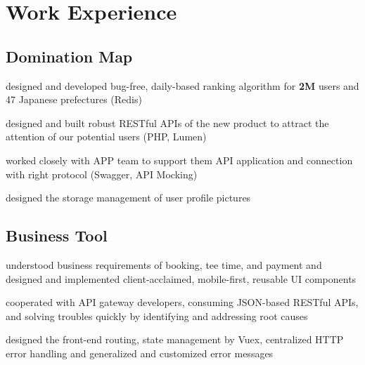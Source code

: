 \documentclass[letterpaper]{deedy-resume} %
\begin{document}
\begin{minipage}[t]{0.66\textwidth} %


\section{Work Experience}

\sectionspace %
\subsection{Domination Map}
\sectionspace %
\begin{tightitemize}
\item designed and developed bug-free, daily-based ranking algorithm for \textbf{2M} users and 47 Japanese prefectures (Redis)
\item designed and built robust RESTful APIs of the new product to attract the attention of our potential users (PHP, Lumen)
\item worked closely with APP team to support them API application and connection with right protocol (Swagger, API Mocking)
\item designed the storage management of user profile pictures
\end{tightitemize}
\sectionspace %
\subsection{Business Tool}
\begin{tightitemize}
\sectionspace %
\item understood business requirements of booking, tee time, and payment and designed and implemented client-acclaimed, mobile-first, reusable UI components
\item cooperated with API gateway developers, consuming JSON-based RESTful APIs, and solving troubles quickly by identifying and addressing root causes
\item designed the front-end routing, state management by Vuex, centralized HTTP error handling and generalized and customized error messages
\end{tightitemize}
\sectionspace %


\end{minipage}
\end{document}
